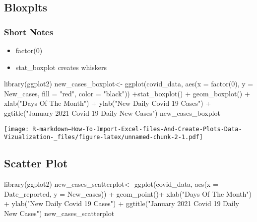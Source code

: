 \documentclass[
]{article}
\newenvironment{Shaded}{\begin{snugshade}}{\end{snugshade}}
\newcommand{\AttributeTok}[1]{\textcolor[rgb]{0.77,0.63,0.00}{#1}}
\newcommand{\DecValTok}[1]{\textcolor[rgb]{0.00,0.00,0.81}{#1}}
\newcommand{\FunctionTok}[1]{\textcolor[rgb]{0.00,0.00,0.00}{#1}}
\newcommand{\NormalTok}[1]{#1}
\newcommand{\OtherTok}[1]{\textcolor[rgb]{0.56,0.35,0.01}{#1}}
\newcommand{\SpecialCharTok}[1]{\textcolor[rgb]{0.00,0.00,0.00}{#1}}
\newcommand{\StringTok}[1]{\textcolor[rgb]{0.31,0.60,0.02}{#1}}
\providecommand{\tightlist}{%
  \setlength{\itemsep}{0pt}\setlength{\parskip}{0pt}}
\begin{document}
\hypertarget{bloxplts}{%
\subsection{Bloxplts}\label{bloxplts}}

\hypertarget{short-notes}{%
\subsubsection{Short Notes}\label{short-notes}}

\begin{itemize}
\tightlist
\item
  factor(0)
\item
  stat\_boxplot creates whiskers
\end{itemize}

\begin{Shaded}
\begin{Highlighting}[]
\FunctionTok{library}\NormalTok{(ggplot2)}
\NormalTok{new\_cases\_boxplot}\OtherTok{\textless{}{-}} \FunctionTok{ggplot}\NormalTok{(covid\_data, }\FunctionTok{aes}\NormalTok{(}\AttributeTok{x =} \FunctionTok{factor}\NormalTok{(}\DecValTok{0}\NormalTok{), }\AttributeTok{y =}\NormalTok{ New\_cases, }\AttributeTok{fill =} \StringTok{"red"}\NormalTok{, }\AttributeTok{color =} \StringTok{"black"}\NormalTok{)) }\SpecialCharTok{+}\FunctionTok{stat\_boxplot}\NormalTok{() }\SpecialCharTok{+} \FunctionTok{geom\_boxplot}\NormalTok{() }\SpecialCharTok{+} \FunctionTok{xlab}\NormalTok{(}\StringTok{"Days Of The Month"}\NormalTok{) }\SpecialCharTok{+} \FunctionTok{ylab}\NormalTok{(}\StringTok{"New Daily Covid 19 Cases"}\NormalTok{) }\SpecialCharTok{+} \FunctionTok{ggtitle}\NormalTok{(}\StringTok{"January 2021 Covid 19 Daily New Cases"}\NormalTok{)}
\NormalTok{new\_cases\_boxplot}
\end{Highlighting}
\end{Shaded}

\texttt{[image: R-markdown---How-To-Import-Excel-files-And-Create-Plots-Data-Vizualization-\_files/figure-latex/unnamed-chunk-2-1.pdf]}

\hypertarget{scatter-plot}{%
\subsection{Scatter Plot}\label{scatter-plot}}

\begin{Shaded}
\begin{Highlighting}[]
\FunctionTok{library}\NormalTok{(ggplot2)}
\NormalTok{new\_cases\_scatterplot}\OtherTok{\textless{}{-}} \FunctionTok{ggplot}\NormalTok{(covid\_data, }\FunctionTok{aes}\NormalTok{(}\AttributeTok{x =}\NormalTok{ Date\_reported, }\AttributeTok{y =}\NormalTok{ New\_cases)) }\SpecialCharTok{+} \FunctionTok{geom\_point}\NormalTok{()}\SpecialCharTok{+} \FunctionTok{xlab}\NormalTok{(}\StringTok{"Days Of The Month"}\NormalTok{) }\SpecialCharTok{+} \FunctionTok{ylab}\NormalTok{(}\StringTok{"New Daily Covid 19 Cases"}\NormalTok{) }\SpecialCharTok{+} \FunctionTok{ggtitle}\NormalTok{(}\StringTok{"January 2021 Covid 19 Daily New Cases"}\NormalTok{)}
\NormalTok{new\_cases\_scatterplot}
\end{Highlighting}
\end{Shaded}
\end{document}
